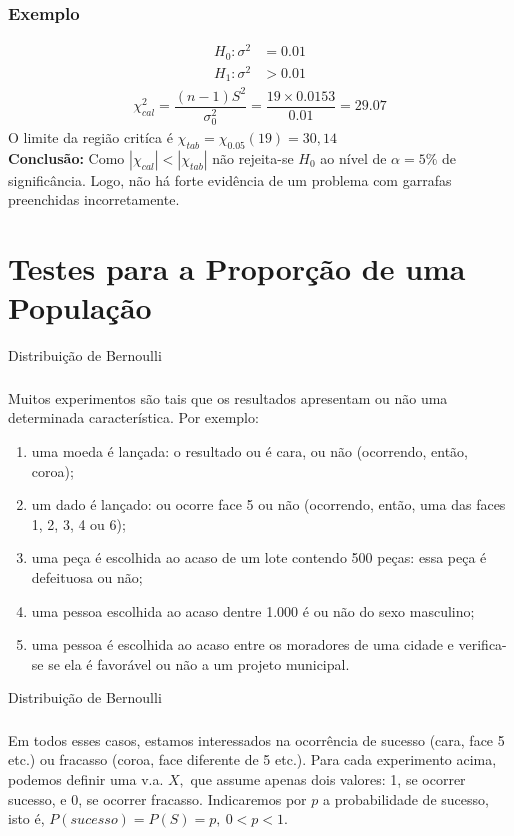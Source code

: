 \documentclass[14pt,aspectratio=1610]{beamer}
\newcommand{\Ho}{\ensuremath{H_{0}}}
\begin{document}
\begin{frame}{}
\frametitle{Exemplo}
\begin{block}{}
\justifying
\begin{align*}
H_{0}: \sigma^{2}&=0.01 \\ 
H_{1}: \sigma^{2}&>0.01
\end{align*}
\begin{align}
\chi^{2}_{cal}=\dfrac{(n-1)S^{2}}{\sigma_{0}^{2}}=\dfrac{19\times0.0153}{0.01}=29.07
\end{align}
O limite da região critíca é $\chi_{tab}=\chi_{0.05}(19)=30,14$\\
\textbf{Conclusão:} Como $|\chi_{cal}|<|\chi_{tab}|$ não rejeita-se $\Ho$ ao nível de $\alpha=5\%$ de significância. Logo, não há forte evidência de um problema com 
garrafas preenchidas incorretamente.
\end{block}
\end{frame}

\section{Testes para a Proporção de uma População}
\begin{frame}{Distribuição de Bernoulli}
\frametitle{}
\begin{block}{}
\justifying
Muitos experimentos são tais que os resultados apresentam ou não uma determinada
característica. Por exemplo:
\begin{enumerate}
\item uma moeda é lançada: o resultado ou é cara, ou não (ocorrendo, então, coroa);\pause
\item um dado é lançado: ou ocorre face 5 ou não (ocorrendo, então, uma das faces
1, 2, 3, 4 ou 6);\pause
\item uma peça é escolhida ao acaso de um lote contendo 500 peças: essa peça é
defeituosa ou não;\pause
\item uma pessoa escolhida ao acaso dentre 1.000 é ou não do sexo masculino;\pause
\item uma pessoa é escolhida ao acaso entre os moradores de uma cidade e verifica-se
se ela é favorável ou não a um projeto municipal.
\end{enumerate}
\end{block}
\end{frame}

\begin{frame}{Distribuição de Bernoulli}
\frametitle{}
\begin{block}{}
\justifying
Em todos esses casos, estamos interessados na ocorrência de sucesso (cara, face 5
etc.) ou fracasso (coroa, face diferente de 5 etc.). Para cada experimento acima, podemos definir uma v.a. $X,$ que assume apenas dois valores: 1, se ocorrer sucesso, e 0, se ocorrer fracasso. Indicaremos por $p$ a probabilidade de sucesso, isto é, 
$P(sucesso)=P(S) = p,\ 0<p<1.$
\end{block}
\end{frame}
\end{document}
